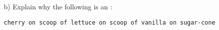 \begin{enumerate}
\begin{itemize}
  \item[b)] Explain why the following is an :

\begin{center}
\texttt{cherry on scoop of lettuce on scoop of vanilla on sugar-cone}
\end{center}
\end{itemize}

\end{enumerate}
